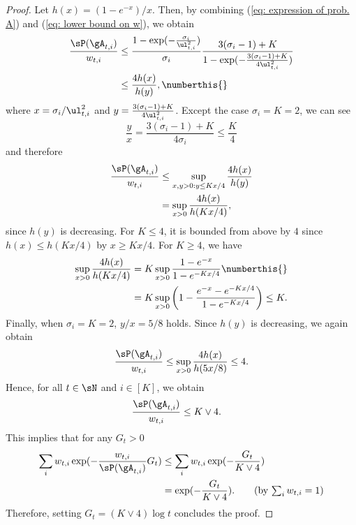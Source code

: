 \begin{proof}
    Let $h(x)=(1-e^{-x})/x$.
    Then, by combining (\ref{eq: expression of prob. A}) and (\ref{eq: lower bound on w}), we obtain
        \begin{align*}
       \frac{\sP(\gA_{t,i})}{w_{t,i}}
        &\leq \frac{1-\exp(-\frac{\sigma_i}{\ul_{t,i}^2})}{\sigma_i} \frac{ 3(\sigma_i-1)+K}{1-\exp(-\frac{3(\sigma_i -1)+K}{4\ul_{t,i}^2})} \\
        &\leq \frac{4h(x)}{h(y)}, \numberthis{\label{eq: P/w ratio}}
    \end{align*}
    where $x=\sigma_i/\ul_{t,i}^2$ and $y=\frac{3(\sigma_i-1)+K}{4\ul_{t,i}^2}$.
    Except the case $\sigma_i=K=2$, we can see 
    \begin{equation*}
        \frac{y}{x} = \frac{3(\sigma_i-1)+K}{4\sigma_i} \leq \frac{K}{4}
    \end{equation*}
    and therefore
    \begin{align*}
    \frac{\sP(\gA_{t,i})}{w_{t,i}} &\le \sup_{x,y>0: y\le Kx/4} \frac{4h(x)}{h(y)}
    \\
    &= \sup_{x>0} \frac{4h(x)}{h(Kx/4)},
    \end{align*}
    since $h(y)$ is decreasing.
    For $K\leq 4$, it is bounded from above by $4$ since $h(x) \leq h(Kx/4)$ by $x\geq Kx/4$.
    For $K \geq 4$, we have
    \begin{align*}
        \sup_{x>0}
        \frac{4h(x)}{h(Kx/4)}
        &=
        K\sup_{x>0}
        \frac{1-e^{-x}}{1-e^{-Kx/4}} \numberthis{\label{eq: h ratio}}\\
        &=
        K\sup_{x>0}
        \left(1-
        \frac{e^{-x}-e^{-Kx/4}}{1-e^{-Kx/4}}
        \right)
        \le K.
    \end{align*}
    Finally, when $\sigma_i = K=2$, $y/x=5/8$ holds.
    Since $h(y)$ is decreasing, we again obtain
    \begin{equation*}
         \frac{\sP(\gA_{t,i})}{w_{t,i}} \le \sup_{x>0} \frac{4h(x)}{h(5x/8)} \leq 4.
    \end{equation*}
    Hence, for all $t \in \sN$ and $i \in [K]$, we obtain
    \begin{align*}
        \frac{\sP(\gA_{t,i})}{w_{t,i}}
        &\le
        K\lor 4.
    \end{align*}
    This implies that for any $G_t >0$
    \begin{align*}
        \sum_i w_{t,i}\exp(-\frac{w_{t,i}}{\sP(\gA_{t,i})}G_t)  &\leq \sum_i w_{t,i}\exp(-\frac{G_t}{K \lor 4}) \\
        &= \exp(-\frac{G_t}{K \lor 4}). \tag{by $ \sum_i w_{t,i} = 1$}
    \end{align*}
    Therefore, setting $G_t = (K\lor 4) \log t$ concludes the proof.
\end{proof} 



